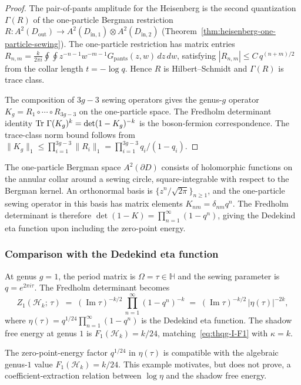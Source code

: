 \begin{proof}
The pair-of-pants amplitude for the Heisenberg is the second quantization $\Gamma(R)$ of the one-particle Bergman restriction $R \colon A^2(D_{\mathrm{out}}) \to A^2(D_{\mathrm{in},1}) \otimes A^2(D_{\mathrm{in},2})$ (Theorem~\ref{thm:heisenberg-one-particle-sewing}). The one-particle restriction has matrix entries $R_{n,m} = \frac{k}{2\pi i} \oint\oint z^{-n-1}w^{-m-1}G_{\mathrm{pants}}(z,w)\,dz\,dw$, satisfying $|R_{n,m}| \leq C\,q^{(n+m)/2}$ from the collar length $t = -\log q$. Hence $R$ is Hilbert--Schmidt and $\Gamma(R)$ is trace class.

The composition of $3g - 3$ sewing operators gives the genus-$g$ operator $K_g = R_1 \circ \cdots \circ R_{3g-3}$ on the one-particle space. The Fredholm determinant identity $\operatorname{Tr}\,\Gamma(K_g)^k = \det(1 - K_g)^{-k}$ is the boson-fermion correspondence. The trace-class norm bound follows from $\|K_g\|_1 \leq \prod_{i=1}^{3g-3} \|R_i\|_1 = \prod_{i=1}^{3g-3} q_i/(1-q_i)$.
\end{proof}

\begin{remark}
\label{rem:thqg-I-bergman}
The one-particle Bergman space $A^2(\partial D)$ consists of holomorphic functions on the annular collar around a sewing circle, square-integrable with respect to the Bergman kernel. An orthonormal basis is $\{z^n / \sqrt{2\pi}\}_{n \geq 1}$, and the one-particle sewing operator in this basis has matrix elements $K_{nm} = \delta_{nm} q^n$. The Fredholm determinant is therefore $\det(1 - K) = \prod_{n=1}^\infty (1 - q^n)$, giving the Dedekind eta function upon including the zero-point energy.
\end{remark}

\subsubsection{Comparison with the Dedekind eta function}

\begin{example}
\label{ex:thqg-I-genus1-eta}
At genus $g = 1$, the period matrix is $\Omega = \tau \in \mathbb{H}$ and the sewing parameter is $q = e^{2\pi i\tau}$. The Fredholm determinant becomes
\begin{equation}\label{eq:thqg-I-genus1-fredholm}
Z_1(\mathcal{H}_k;\,\tau) \;=\; (\operatorname{Im}\tau)^{-k/2}\, \prod_{n=1}^{\infty} (1 - q^n)^{-k} \;=\; (\operatorname{Im}\tau)^{-k/2}\, \bigl|\eta(\tau)\bigr|^{-2k},
\end{equation}
where $\eta(\tau) = q^{1/24}\prod_{n=1}^{\infty}(1 - q^n)$ is the Dedekind eta function. The shadow free energy at genus $1$ is $F_1(\mathcal{H}_k) = k/24$, matching~\eqref{eq:thqg-I-F1} with $\kappa = k$.

The zero-point-energy factor $q^{1/24}$ in $\eta(\tau)$ is compatible
with the algebraic genus-$1$ value $F_1(\mathcal{H}_k)=k/24$. This
example motivates, but does not prove, a coefficient-extraction
relation between $\log\eta$ and the shadow free energy.
\end{example}

